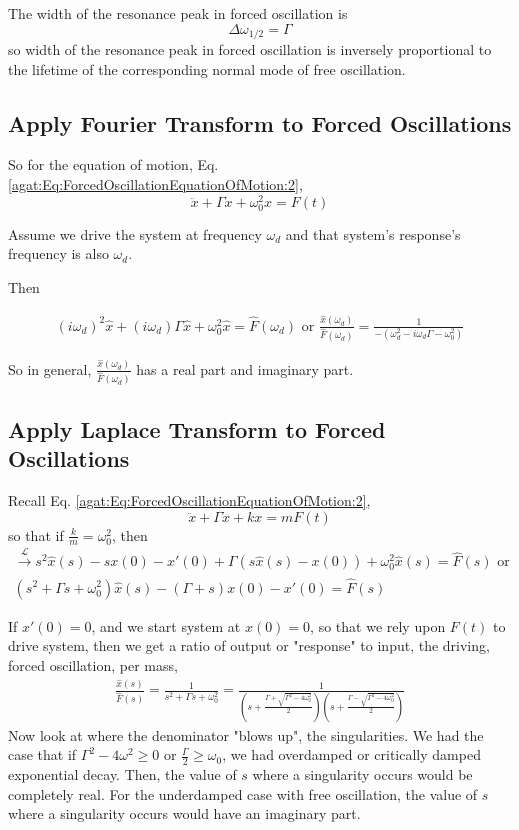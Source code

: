 The width of the resonance peak in forced oscillation is 
\[
\Delta \omega_{1/2} = \Gamma
\]
so width of the resonance peak in forced oscillation is inversely proportional to the lifetime of the corresponding normal mode of free oscillation.

\subsection{Apply Fourier Transform to Forced Oscillations}

So for the equation of motion, Eq. \ref{agat:Eq:ForcedOscillationEquationOfMotion:2},
\[
\ddot{x} + \Gamma \dot{x} + \omega_0^2 x = F(t)
\]

Assume we drive the system at frequency $\omega_d$ and that system's response's frequency is also $\omega_d$.

Then

\[
\begin{gathered}
(i\omega_d)^2 \widehat{x} + (i\omega_d) \Gamma \widehat{x} + \omega_0^2 \widehat{x} = \widehat{F}(\omega_d) \text{ or } \frac{ \widehat{x}(\omega_d) }{ \widehat{F}(\omega_d) } = \frac{1}{ - (\omega_d^2 - i \omega_d \Gamma - \omega_0^2) }
\end{gathered}
\]

So in general, $\frac{ \widehat{x}(\omega_d) }{ \widehat{F}(\omega_d) }$ has a real part and imaginary part.

\subsection{Apply Laplace Transform to Forced Oscillations}

Recall Eq. \ref{agat:Eq:ForcedOscillationEquationOfMotion:2},
\[
\ddot{x} + \Gamma \dot{x} + k x = mF(t)
\]
so that if $\frac{k}{m} = \omega_0^2$, then
\[
\begin{gathered}
\xrightarrow{ \mathcal{L}} s^2 \widehat{x}(s) - s x(0) - x'(0) + \Gamma (s\widehat{x}(s) - x(0)) + \omega_0^2 \widehat{x}(s) = \widehat{F}(s) \text{ or } \\
(s^2 + \Gamma s + \omega_0^2) \widehat{x}(s) - (\Gamma + s) x(0) - x'(0) = \widehat{F}(s)
\end{gathered}
\]

If $x'(0) = 0$, and we start system at $x(0) =0$, so that we rely upon $F(t)$ to drive system, then we get a ratio of output or "response" to input, the driving, forced oscillation, per mass,
\[
\begin{gathered}
	\frac{ \widehat{x}(s) }{ \widehat{F}(s) } = \frac{1}{ s^2 + \Gamma s + \omega_0^2 } = \frac{1}{ \left( s + \frac{ \Gamma + \sqrt{ \Gamma^2 - 4 \omega_0^2 } }{ 2 } \right) \left( s + \frac{ \Gamma - \sqrt{ \Gamma^2 - 4 \omega_0^2 } }{ 2} \right) }
\end{gathered}
\]
Now look at where the denominator "blows up", the singularities. We had the case that if $\Gamma^2 - 4\omega^2 \geq 0 $ or $\frac{\Gamma}{2} \geq \omega_0$, we had overdamped or critically damped exponential decay. Then, the value of $s$ where a singularity occurs would be completely real. For the underdamped case with free oscillation, the value of $s$ where a singularity occurs would have an imaginary part.

